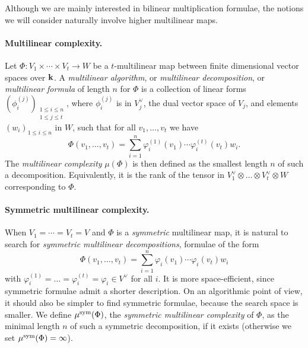 \documentclass[11pt]{article}
\begin{document}
Although we are mainly interested in bilinear multiplication formulae,
the notions we will consider naturally involve higher multilinear maps.

\paragraph{Multilinear complexity.}
Let $\Phi:V_1\times\cdots\times V_t\to W$
be a $t$-multilinear map between finite dimensional vector spaces over $\mathbf{k}$.
A \emph{multilinear algorithm}, or \emph{multilinear decomposition}, or
\emph{multilinear formula} of length $n$ for $\Phi$ is a collection of linear
forms $(\phi_i^{(j)})_{\substack{1\leq i \leq n\\1\leq j\leq t}}$,
where $\phi_i^{(j)}$ is in $V_j^\vee$, the dual vector space of $V_j$,
and elements $(w_i)_{1\leq i \leq n}$ in $W$, 
such that for all $v_1,\dots,v_t$ we have
\[
  \Phi(v_1,\dots,v_t)=\sum_{i=1}^{n}\varphi_i^{(1)}(v_1)\cdots\varphi_i^{(t)}(v_t)w_i.
\]
The \emph{multilinear complexity} $\mu(\Phi)$ is then defined as the smallest
length $n$ of such a decomposition.
Equivalently, it is the rank of the tensor in
$V_1^\vee \otimes\dots\otimes V_t^\vee\otimes W$
corresponding to $\Phi$.

\paragraph{Symmetric multilinear complexity.}
When $V_1=\cdots=V_t=V$ and $\Phi$ is a \emph{symmetric} multilinear map, it is
natural to search for \emph{symmetric multilinear decompositions}, \ie formulae of the form
\begin{equation*}
  \Phi(v_1,\dots,v_t)=\sum_{i=1}^{n}\varphi_i(v_1)\cdots\varphi_i(v_t)w_i
\end{equation*}
with $\varphi_i^{(1)}=\dots=\varphi_i^{(t)}=\varphi_i\in V^\vee$ for all $i$.
It is more space-efficient, since symmetric formulae admit a shorter description.
On an algorithmic point of view, it should also be simpler to find symmetric formulae,
because the search space is smaller. 
We define $\mu^{\textrm{sym}}(\Phi)$,
the \emph{symmetric multilinear complexity} of $\Phi$,
as the minimal length $n$ of such a symmetric decomposition, if it exists
(otherwise we set $\mu^{\textrm{sym}}(\Phi)=\infty$).
\end{document}
